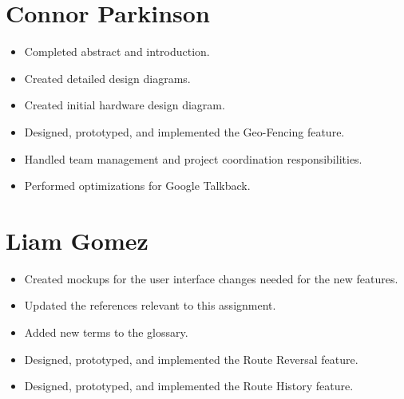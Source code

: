 \documentclass{scrreprt}
\begin{document}
	\section{Connor Parkinson}
		\begin{itemize}
			\item Completed abstract and introduction.
			\item Created detailed design diagrams.
			\item Created initial hardware design diagram.
			
			\item \begin{highlightbox} 
			Designed, prototyped, and implemented the Geo-Fencing feature.
			\end{highlightbox}
				
			\item \begin{highlightbox}
			Handled team management and project coordination responsibilities.
			\end{highlightbox}
				
			\item \begin{highlightbox} 
			Performed optimizations for Google Talkback.
			\end{highlightbox}
		\end{itemize}
\pagebreak
	\section{Liam Gomez}
		\begin{itemize}
			\item Created mockups for the user interface changes needed for the new features.
			\item Updated the references relevant to this assignment.
			\item Added new terms to the glossary.
			\item \begin{highlightbox} 
			Designed, prototyped, and implemented the Route Reversal feature.
			\end{highlightbox}
			\item \begin{highlightbox} 
			Designed, prototyped, and implemented the Route History feature.
			\end{highlightbox}
		\end{itemize}
		
\end{document}
